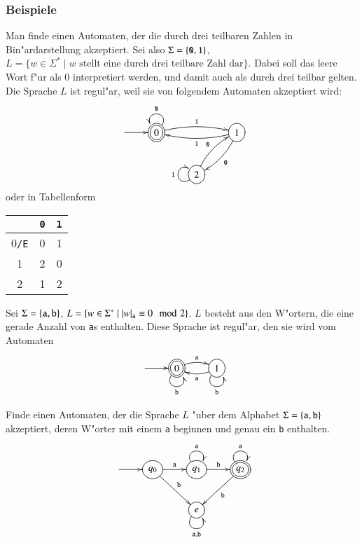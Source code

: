 \subsubsection{Beispiele}
\begin{beispiel} 
Man finde einen Automaten, der die durch drei teilbaren Zahlen in
Bin"ardarstellung akzeptiert.
Sei also $\Sigma=\{{\tt 0},{\tt 1}\}$,
$L=\{w\in\Sigma^*\;|\; \text{$w$ stellt eine durch drei teilbare Zahl dar}\}.$
Dabei soll das leere Wort f"ur als $0$
interpretiert werden, und damit auch als durch drei teilbar gelten.
Die Sprache $L$ ist regul"ar, weil sie
von folgendem Automaten akzeptiert wird:
\[
\entrymodifiers={++[o][F]}
\xymatrix{
*+\txt{} \ar[r]
	&*++[o][F=]{0} \ar@/^/[rr]^{\tt 1} \ar@(ur,ul)_{\tt 0}
		&*+\txt{}
			&{1} \ar@/^/[dl]^{\tt 0}  \ar@/^/[ll]^{\tt 1}
\\
*+\txt{}
	&*+\txt{}
		&2\ar@/^/[ur]^{\tt 0} \ar@(dl,ul)^{\tt 1}
}
\]
oder in Tabellenform
\begin{center}
\begin{tabular}{|c|cc|}
\hline
&\tt 0&\tt 1\\
\hline
0{\tt /E}&0&1\\
1        &2&0\\
2        &1&2\\
\hline
\end{tabular}
\end{center}
\end{beispiel}

\begin{beispiel}
Sei $\Sigma=\{{\tt a},{\tt b}\}$,
$L=\{w\in\Sigma^*\;|\; |w|_{\tt a}\equiv 0\mod 2\}$. $L$ besteht aus
den W"ortern, die  eine gerade Anzahl von {\tt a}s enthalten. Diese
Sprache ist regul"ar, den sie wird vom Automaten
\[
\entrymodifiers={++[o][F]}
\xymatrix{
*+\txt{} \ar[r]
	&*++[o][F=]{0}\ar@/^/[r]^{\tt a} \ar@(dl,dr)_{\tt b}
		&1 \ar@/^/[l]^{\tt a} \ar@(dl,dr)_{\tt b}
}
\]
\end{beispiel}

\begin{beispiel}
Finde einen Automaten, der die Sprache $L$ "uber dem Alphabet
$\Sigma=\{{\tt a},{\tt b}\}$ akzeptiert, deren W"orter mit 
einem {\tt a} beginnen und genau ein {\tt b} enthalten.
\[
\entrymodifiers={++[o][F]}
\xymatrix{
*+\txt{} \ar[r]
	&{q_0} \ar[r]^{\tt a} \ar[dr]^{\tt b}
		&{q_1} \ar@(ul,ur)^{\tt a} \ar[r]^{\tt b}
			&*++[o][F=]{q_2}\ar@(ul,ur)^{\tt a}  \ar[dl]^{\tt b}
\\
*+\txt{}
	&*+\txt{}
		&{e}\ar@(dl,dr)_{{\tt a},{\tt b}}
}
\]
\end{beispiel}

